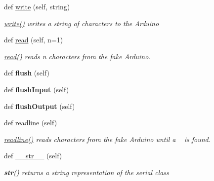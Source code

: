 \begin{DoxyCompactItemize}
\mbox{\label{classfake_serial_1_1_serial_abc4ef915d782f9e4a8d1d6f398298a6d}} 
def \mbox{\hyperlink{classfake_serial_1_1_serial_abc4ef915d782f9e4a8d1d6f398298a6d}{write}} (self, string)
\begin{DoxyCompactList}\small\item\em \mbox{\hyperlink{classfake_serial_1_1_serial_abc4ef915d782f9e4a8d1d6f398298a6d}{write()}} writes a string of characters to the Arduino \end{DoxyCompactList}\item 
def \mbox{\hyperlink{classfake_serial_1_1_serial_a46f1021e19572ff944e886e53a51a1d1}{read}} (self, n=1)
\begin{DoxyCompactList}\small\item\em \mbox{\hyperlink{classfake_serial_1_1_serial_a46f1021e19572ff944e886e53a51a1d1}{read()}} reads n characters from the fake Arduino. \end{DoxyCompactList}\item 
\mbox{\label{classfake_serial_1_1_serial_a3c34cb0659b6d0dd5924ac79d79ad6bf}} 
def {\bfseries flush} (self)
\item 
\mbox{\label{classfake_serial_1_1_serial_a6abb75597f64f245df8e0c7f62c7fde5}} 
def {\bfseries flush\+Input} (self)
\item 
\mbox{\label{classfake_serial_1_1_serial_afecff2730c11a9a8e7f687c57a2c738a}} 
def {\bfseries flush\+Output} (self)
\item 
def \mbox{\hyperlink{classfake_serial_1_1_serial_a58f35303f074c25e972c0b16c6382bf4}{readline}} (self)
\begin{DoxyCompactList}\small\item\em \mbox{\hyperlink{classfake_serial_1_1_serial_a58f35303f074c25e972c0b16c6382bf4}{readline()}} reads characters from the fake Arduino until a ~\newline
 is found. \end{DoxyCompactList}\item 
\mbox{\label{classfake_serial_1_1_serial_a597b04385c851077ccc3363f4bfb32c1}} 
def \mbox{\hyperlink{classfake_serial_1_1_serial_a597b04385c851077ccc3363f4bfb32c1}{\+\_\+\+\_\+str\+\_\+\+\_\+}} (self)
\begin{DoxyCompactList}\small\item\em {\bfseries{str}}() returns a string representation of the serial class \end{DoxyCompactList}\end{DoxyCompactItemize}

